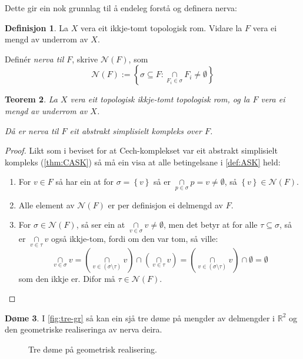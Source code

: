 \documentclass[a4paper, 12pt, norsk]{article}
\theoremstyle{plain}
\newtheorem{theorem}{Teorem}[section]
\theoremstyle{definition}
\newtheorem{definition}[theorem]{Definisjon}
\newtheorem{example}[theorem]{Døme}
\newcommand{\Rb}{\mathbb{R}}
\newcommand{\Nc}{\mathcal{N}}
\newcommand{\intersect}{ \mathop{\cap}\limits }
\newcommand{\set}[1]{ \left\{ #1 \right\} } %
\begin{document}
Dette gir ein nok grunnlag til å endeleg forstå og definera nerva:

\begin{definition}
	La $X$ vera eit ikkje-tomt topologisk rom. Vidare la $F$ vera ei mengd av underrom av $X$. 
	
	Definér \emph{nerva til $F$}, skrive $\Nc(F)$, som
	\begin{equation*}
		\Nc(F) := \left \{ \sigma \subseteq F : \intersect_{ F_i \in \sigma } F_i \neq \emptyset \right \}
	\end{equation*}
\end{definition}

\begin{theorem}
	La $X$ vera eit topologisk ikkje-tomt topologisk rom, og la $F$ vera ei mengd av underrom av $X$.
	
	Då er nerva til $F$ eit abstrakt simplisielt kompleks over $F$.
\end{theorem}

\begin{proof}
	Likt som i beviset for at Cech-komplekset var eit abstrakt simplisielt kompleks (\autoref{thm:CASK}) så må ein visa at alle betingelsane i \autoref{def:ASK} held:
	\begin{enumerate}
		\item{ 
			For \( v \in F \) så har ein at for \( \sigma = \set{ v } \) så er \( \intersect_{ p \in \sigma } p = v \neq \emptyset \), så \( \set{v} \in \Nc(F) \).
		}
		\item{ 
			Alle element av \( \Nc(F) \) er per definisjon ei delmengd av \( F \).
		}
		\item{  
			For \( \sigma \in \Nc(F) \), så ser ein at \( \intersect_{v\in\sigma} v \neq \emptyset \), men det betyr at for alle \( \tau \subseteq \sigma \), så er \( \intersect_{v\in\tau} v \) også ikkje-tom, fordi om den var tom, så ville: 
			\[ 
				\intersect_{v\in\sigma} v = \left( \intersect_{v\in(\sigma\setminus\tau)} v \right) \intersect \left( \intersect_{v\in\tau} v \right) = \left( \intersect_{v\in(\sigma\setminus\tau)} v \right) \intersect \emptyset = \emptyset 
			\] 
			som den ikkje er. Difor må \( \tau \in \Nc(F) \).
		}
	\end{enumerate}
\end{proof}

\begin{example}
	I \autoref{fig:tre-gr} så kan ein sjå tre døme på mengder av delmengder i \( \Rb^2 \) og den geometriske realiseringa av nerva deira.
	\begin{figure}[htbp]
		\begin{center}
			
		\end{center}
		\caption{Tre døme på geometrisk realisering.}
		\label{fig:tre-gr}
	\end{figure}
\end{example}
\end{document}
